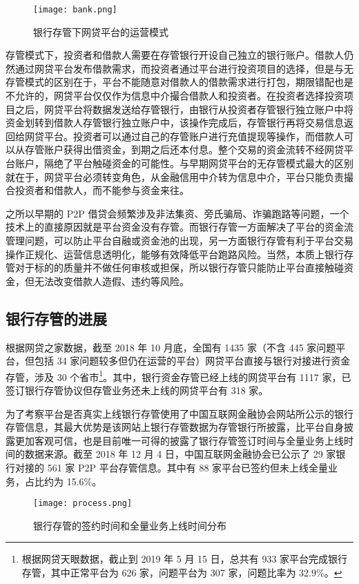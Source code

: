 \documentclass[lang=cn,11pt,authoryear]{elegantpaper}
\begin{document}
\begin{figure}
\centering
\texttt{[image: bank.png]}
\caption{银行存管下网贷平台的运营模式\label{fig:bank}}
\end{figure}

存管模式下，投资者和借款人需要在存管银行开设自己独立的银行账户。借款人仍然通过网贷平台发布借款需求，而投资者通过平台进行投资项目的选择，但是与无存管模式的区别在于，平台不能随意对借款人的借款需求进行打包，期限错配也是不允许的，网贷平台仅仅作为信息中介撮合借款人和投资者。在投资者选择投资项目之后，网贷平台将数据发送给存管银行，由银行从投资者存管银行独立账户中将资金划转到借款人存管银行独立账户中，该操作完成后，存管银行再将交易信息返回给网贷平台。投资者可以通过自己的存管账户进行充值提现等操作，而借款人可以从存管账户获得出借资金，到期之后还本付息。整个交易的资金流转不经网贷平台账户，隔绝了平台触碰资金的可能性。与早期网贷平台的无存管模式最大的区别就在于，网贷平台必须转变角色，从金融信用中介转为信息中介，平台只能负责撮合投资者和借款人，而不能参与资金来往。

之所以早期的 P2P 借贷会频繁涉及非法集资、旁氏骗局、诈骗跑路等问题，一个技术上的直接原因就是平台资金没有存管。而银行存管一方面解决了平台的资金流管理问题，可以防止平台自融或资金池的出现，另一方面银行存管有利于平台交易操作正规化、运营信息透明化，能够有效降低平台跑路风险。当然，本质上银行存管对于标的的质量并不做任何审核或担保，所以银行存管只能防止平台直接触碰资金，但无法改变借款人造假、违约等风险。

\subsection{银行存管的进展}
根据网贷之家数据，截至 2018 年 10 月底，全国有 1435 家（不含 445 家问题平台，但包括 34 家问题较多但仍在运营的平台）网贷平台直接与银行对接进行资金存管，涉及 30 个省市\footnote{根据网贷天眼数据，截止到 2019 年 5 月 15 日，总共有 933 家平台完成银行存管，其中正常平台为 626 家，问题平台为 307 家，问题比率为 32.9\%。}。其中，银行资金存管已经上线的网贷平台有 1117 家，已签订银行存管协议但存管业务还未上线的网贷平台有 318 家。

为了考察平台是否真实上线银行存管使用了中国互联网金融协会网站所公示的银行存管信息，其最大优势是该网站上银行存管数据为存管银行所披露，比平台自身披露更加客观可信，也是目前唯一可得的披露了银行存管签订时间与全量业务上线时间的数据来源。截至 2018 年 12 月 4 日，中国互联网金融协会已公示了 29 家银行对接的 561 家 P2P 平台存管信息。其中有 88 家平台已签约但未上线全量业务，占比约为 15.6\%。

\begin{figure}
\centering
\texttt{[image: process.png]}
\caption{银行存管的签约时间和全量业务上线时间分布\label{fig:process}}
\end{figure}
\end{document}
